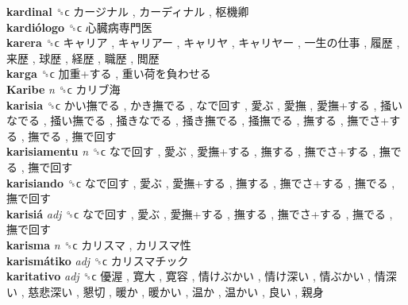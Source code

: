 \textbf{kardinal} ␝ϲ   カージナル ,  カーディナル ,  枢機卿   \\
\textbf{kardiólogo} ␝ϲ   心臓病専門医   \\
\textbf{karera} ␝ϲ   キャリア ,  キャリアー ,  キャリヤ ,  キャリヤー ,  一生の仕事 ,  履歴 ,  来歴 ,  球歴 ,  経歴 ,  職歴 ,  閲歴   \\
\textbf{karga} ␝ϲ   加重+する ,  重い荷を負わせる   \\
\textbf{Karibe} \emph{n}  ␝ϲ   カリブ海   \\
\textbf{karisia} ␝ϲ   かい撫でる ,  かき撫でる ,  なで回す ,  愛ぶ ,  愛撫 ,  愛撫+する ,  掻いなでる ,  掻い撫でる ,  掻きなでる ,  掻き撫でる ,  掻撫でる ,  撫する ,  撫でさ+する ,  撫でる ,  撫で回す   \\
\textbf{karisiamentu} \emph{n}  ␝ϲ   なで回す ,  愛ぶ ,  愛撫+する ,  撫する ,  撫でさ+する ,  撫でる ,  撫で回す   \\
\textbf{karisiando} ␝ϲ   なで回す ,  愛ぶ ,  愛撫+する ,  撫する ,  撫でさ+する ,  撫でる ,  撫で回す   \\
\textbf{karisiá} \emph{adj}  ␝ϲ   なで回す ,  愛ぶ ,  愛撫+する ,  撫する ,  撫でさ+する ,  撫でる ,  撫で回す   \\
\textbf{karisma} \emph{n}  ␝ϲ   カリスマ ,  カリスマ性   \\
\textbf{karismátiko} \emph{adj}  ␝ϲ   カリスマチック   \\
\textbf{karitativo} \emph{adj}  ␝ϲ   優渥 ,  寛大 ,  寛容 ,  情けぶかい ,  情け深い ,  情ぶかい ,  情深い ,  慈悲深い ,  懇切 ,  暖か ,  暖かい ,  温か ,  温かい ,  良い ,  親身   \\
